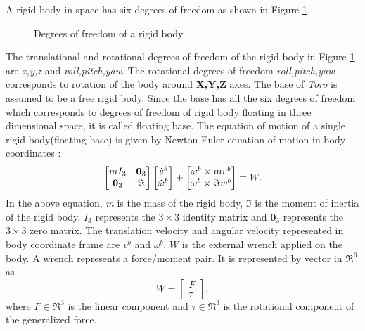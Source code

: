 A rigid body in space has six degrees of freedom as shown in Figure \ref{fig:rbody}.
\begin{figure}
\begin{center}

\vspace{1cm}
\caption{Degrees of freedom of a rigid body }
\label{fig:rbody}
\end{center}
\end{figure}
The translational and rotational degrees of freedom of the rigid body in Figure \ref{fig:rbody} are \emph{x,y,z} and \emph{roll,pitch,yaw}. The rotational degrees of freedom \emph{roll,pitch,yaw} corresponds to rotation of the body around \textbf{X,Y,Z} axes. The base of \emph{Toro} is assumed to be a free rigid body. Since the base has all the six degrees of freedom which corresponds to degrees of freedom of rigid body floating in three dimensional space, it is called floating base. The equation of motion of a single rigid body(floating base) is given by Newton-Euler equation of motion in body coordinates \cite[Chapter 4]{mur94}:
\begin{equation}
\label{eq:dyn_rig_bdy}
\begin{bmatrix}
mI_3 & \textbf{0}_3 \\ \textbf{0}_3 &\Im
\end{bmatrix}
\begin{bmatrix}
\dot{v}^b\\ \dot{\omega}^b
\end{bmatrix}
+ \begin{bmatrix}
\omega^b \times mv^b \\ 
\omega^b \times \Im w^b
\end{bmatrix}
= W.\\
\end{equation}
In the above equation, \emph{m} is the mass of the rigid body, $\Im$ is the moment of inertia of the rigid body. $I_3$ represents the $3 \times 3$ identity matrix and $ \textbf{0}_3$ represents the  $3 \times 3$ zero matrix. The translation velocity and angular velocity represented in body coordinate frame are ${v}^b$ and $\omega^b$. $W$ is the external wrench applied on the body. A wrench represents a force/moment pair. It is represented by vector in $\Re^6$ as \citep{mur94}
$$ W = \begin{bmatrix} F \\ \tau \end{bmatrix}, $$ where $F \in \Re^3$ is the linear component and $\tau \in \Re^3$ is the rotational component of the generalized force.

